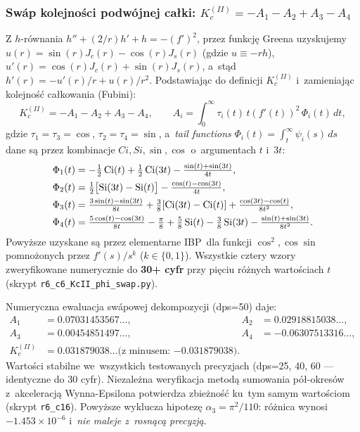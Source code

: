 \subsubsection{Sw\'ap kolejno\'sci podwójnej ca\l{}ki: $K_c^{(II)} = -A_1 - A_2 + A_3 - A_4$}
\label{sec:T6-swap}

Z $h$-r\'ownania $h'' + (2/r) h' + h = -(f')^2$, przez funkcj\k{e} Greena uzyskujemy
$u(r) = \sin(r) J_c(r) - \cos(r) J_s(r)$ (gdzie $u \equiv -rh$),
$u'(r) = \cos(r) J_c(r) + \sin(r) J_s(r)$, a~st\k{a}d
$h'(r) = -u'(r)/r + u(r)/r^2$. Podstawiaj\k{a}c do definicji $K_c^{(II)}$
i~zamieniaj\k{a}c kolejno\'s\'c ca\l{}kowania (Fubini):
\begin{equation}
  K_c^{(II)} = -A_1 - A_2 + A_3 - A_4,
  \qquad A_i = \int_0^\infty \tau_i(t)\, t (f'(t))^2\, \Phi_i(t)\, dt,
\end{equation}
gdzie $\tau_1 = \tau_3 = \cos$, $\tau_2 = \tau_4 = \sin$, a~\emph{tail functions}
$\Phi_i(t) = \int_t^\infty \psi_i(s)\, ds$ dane s\k{a} przez kombinacje
$Ci, Si, \sin, \cos$ o~argumentach $t$ i~$3t$:
\begin{align}
  \Phi_1(t) &= -\tfrac{1}{2} \operatorname{Ci}(t) + \tfrac{1}{2} \operatorname{Ci}(3t) - \tfrac{\sin(t)+\sin(3t)}{4t}, \\
  \Phi_2(t) &= \tfrac{1}{2}\bigl[\operatorname{Si}(3t) - \operatorname{Si}(t)\bigr] - \tfrac{\cos(t) - \cos(3t)}{4t}, \\
  \Phi_3(t) &= \tfrac{3\sin(t) - \sin(3t)}{8t} + \tfrac{3}{8}[\operatorname{Ci}(3t) - \operatorname{Ci}(t)]
              + \tfrac{\cos(3t) - \cos(t)}{8 t^2}, \\
  \Phi_4(t) &= \tfrac{5\cos(t) - \cos(3t)}{8t} - \tfrac{\pi}{8} + \tfrac{5}{8}\operatorname{Si}(t)
              - \tfrac{3}{8}\operatorname{Si}(3t) - \tfrac{\sin(t) + \sin(3t)}{8 t^2}.
\end{align}
Powy\.zsze uzyskane s\k{a} przez elementarne IBP~dla funkcji $\cos^2, \cos\sin$
pomno\.zonych przez $f'(s)/s^k$ ($k \in \{0,1\}$). Wszystkie cztery wzory
zweryfikowane numerycznie do \textbf{30+ cyfr} przy pi\k{e}ciu r\'o\.znych warto\'sciach $t$
(skrypt \texttt{r6\_c6\_KcII\_phi\_swap.py}).

Numeryczna ewaluacja sw\'apowej dekompozycji (dps=50) daje:
\begin{align}
  A_1 &= 0.07031453567\ldots, &
  A_2 &= 0.02918815038\ldots, \\
  A_3 &= 0.00454851497\ldots, &
  A_4 &= -0.06307513316\ldots, \\
  K_c^{(II)} &= 0.031879038\ldots \text{(z minusem: $-0.031879038$)}.
\end{align}
Warto\'sci stabilne we~wszystkich testowanych precyzjach (dps=25, 40, 60 ---
identyczne do 30 cyfr). Niezale\.zna weryfikacja metod\k{a} sumowania
p\'o\l{}-okres\'ow z~akceleracj\k{a} Wynna-Epsilona potwierdza zbie\.zno\'s\'c
ku~tym samym warto\'sciom (skrypt \texttt{r6\_c16}).
Powy\.zsze wyklucza hipotez\k{e} $\alpha_3 = \pi^2/110$:
r\'o\.znica wynosi $-1.453 \times 10^{-6}$ i~\emph{nie maleje z~rosn\k{a}c\k{a} precyzj\k{a}}.

